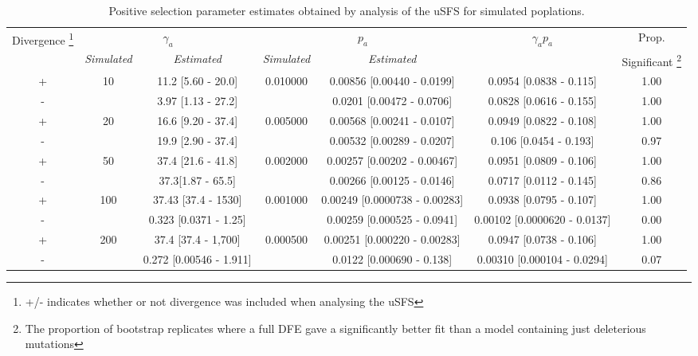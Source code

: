 
\begin{sidewaystable}
\caption{Positive selection parameter estimates obtained by analysis of the uSFS for simulated poplations. }
\begin{tabular}{ccccccc}

\toprule
 \multirow{2}{*}{Divergence \footnote{+/- indicates whether or not divergence was included when analysing the uSFS} } & \multicolumn{2}{c}{$\gamma_a$} & \multicolumn{2}{c}{$p_a$}  & \multirow{2}{*}{$\gamma_a p_a$} & Prop.\\
 	&    \textit{Simulated} & \textit{Estimated} & \textit{Simulated} & \textit{Estimated} &  &  Significant \footnote{The proportion of bootstrap replicates where a full DFE gave a significantly better fit than a model containing just deleterious mutations}\\
\midrule
         + &    \multirow{2}{*}{10} & 11.2 [5.60 - 20.0] &  \multirow{2}{*}{0.010000} & 0.00856 [0.00440 - 0.0199] &  0.0954 [0.0838 - 0.115] &  1.00 \\
         - &     & 3.97 [1.13 - 27.2] &   &         0.0201 [0.00472 - 0.0706] &  0.0828 [0.0616 - 0.155] &               1.00 \\
         + &   \multirow{2}{*}{20} &           16.6 [9.20 - 37.4] &  \multirow{2}{*}{0.005000} &  0.00568 [0.00241 - 0.0107] &  0.0949 [0.0822 - 0.108] & 1.00 \\
         - &    &        19.9 [2.90 - 37.4] &   & 0.00532 [0.00289 - 0.0207] &  0.106 [0.0454 - 0.193] &  0.97 \\
         + &   \multirow{2}{*}{50} &   37.4 [21.6 - 41.8] &  \multirow{2}{*}{0.002000} & 0.00257 [0.00202 - 0.00467] &  0.0951 [0.0809 - 0.106] & 1.00 \\
         - &    &   37.3[1.87 - 65.5] &  & 0.00266 [0.00125 - 0.0146] &  0.0717 [0.0112 - 0.145] &  0.86 \\
         + &   \multirow{2}{*}{100} &   37.43 [37.4 - 1530] &  \multirow{2}{*}{0.001000} &        0.00249 [0.0000738 - 0.00283] &   0.0938 [0.0795 - 0.107] &  1.00 \\
         - &    &  0.323 [0.0371 - 1.25] &   &  0.00259 [0.000525 - 0.0941] &  0.00102 [0.0000620 - 0.0137] & 0.00 \\
         + &  \multirow{2}{*}{200} &  37.4 [37.4 - 1,700] &  \multirow{2}{*}{0.000500} & 0.00251 [0.000220 - 0.00283] &     0.0947 [0.0738 - 0.106] & 1.00 \\
         - &   &            0.272 [0.00546 - 1.911] &   &                     0.0122 [0.000690 - 0.138] &  0.00310 [0.000104 - 0.0294] & 0.07 \\

\end{tabular}
\end{sidewaystable}
